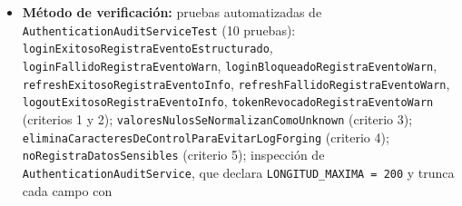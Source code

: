 \documentclass[
  spanish,
]{article}
\providecommand{\tightlist}{%
  \setlength{\itemsep}{0pt}\setlength{\parskip}{0pt}}
\begin{document}
\begin{itemize}
  \begin{enumerate}
  \def\labelenumi{\arabic{enumi}.}
  \tightlist
  \item
    Cada uno de los siete eventos enumerados produce una línea de log
    con prefijo \texttt{AUTH\_\allowbreak{}AUDIT}, el tipo de evento, la IP, la marca
    de tiempo UTC y el sujeto.
  \item
    Los eventos de fallo o bloqueo se registran con nivel \texttt{WARN}
    y los de éxito con nivel \texttt{INFO}.
  \item
    Un valor nulo de IP o de sujeto se normaliza a \texttt{unknown},
    nunca produce una línea incompleta.
  \item
    Los caracteres de control se eliminan del sujeto antes de
    registrarlo, de modo que no se puedan inyectar saltos de línea ni
    líneas falsas (\emph{log forging}).
  \item
    Ninguna línea contiene contraseñas, hashes ni tokens.
  \item
    Ningún campo registrado supera 200 caracteres.
  \end{enumerate}
\item
  \textbf{Método de verificación:} pruebas automatizadas de
  \texttt{Authentication\allowbreak{}Audit\allowbreak{}Service\allowbreak{}Test} (10 pruebas):
  \texttt{login\allowbreak{}Exitoso\allowbreak{}Registra\allowbreak{}Evento\allowbreak{}Estructurado},
  \texttt{login\allowbreak{}Fallido\allowbreak{}Registra\allowbreak{}Evento\allowbreak{}Warn},
  \texttt{login\allowbreak{}Bloqueado\allowbreak{}Registra\allowbreak{}Evento\allowbreak{}Warn},
  \texttt{refresh\allowbreak{}Exitoso\allowbreak{}Registra\allowbreak{}Evento\allowbreak{}Info},
  \texttt{refresh\allowbreak{}Fallido\allowbreak{}Registra\allowbreak{}Evento\allowbreak{}Warn},
  \texttt{logout\allowbreak{}Exitoso\allowbreak{}Registra\allowbreak{}Evento\allowbreak{}Info},
  \texttt{token\allowbreak{}Revocado\allowbreak{}Registra\allowbreak{}Evento\allowbreak{}Warn} (criterios 1 y 2);
  \texttt{valores\allowbreak{}Nulos\allowbreak{}Se\allowbreak{}Normalizan\allowbreak{}Como\allowbreak{}Unknown} (criterio 3);
  \texttt{elimina\allowbreak{}Caracteres\allowbreak{}De\allowbreak{}Control\allowbreak{}Para\allowbreak{}Evitar\allowbreak{}Log\allowbreak{}Forging} (criterio 4);
  \texttt{no\allowbreak{}Registra\allowbreak{}Datos\allowbreak{}Sensibles} (criterio 5); inspección de
  \texttt{Authentication\allowbreak{}Audit\allowbreak{}Service}, que declara
  \texttt{LONGITUD\_\allowbreak{}MAXIMA\ =\ 2\allowbreak{}00} y trunca cada campo con

\end{itemize}
\end{document}
